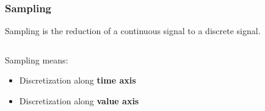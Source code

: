 \begin{frame}
    \frametitle{Sampling}
    \begin{myDefinition}
        Sampling is the reduction of a continuous signal to a discrete signal.
    \end{myDefinition}

    \vspace{5mm}

    \begin{columns}[c, onlytextwidth]
        \begin{column}{0.4\textwidth}
            Sampling means:
            \begin{itemize}
                \item Discretization along \textbf<1>{time axis}
                \item Discretization along \textbf<2>{value axis}
            \end{itemize}
        \end{column}\begin{column}{0.6\textwidth}
\end{column}
\end{columns}
\end{frame}

